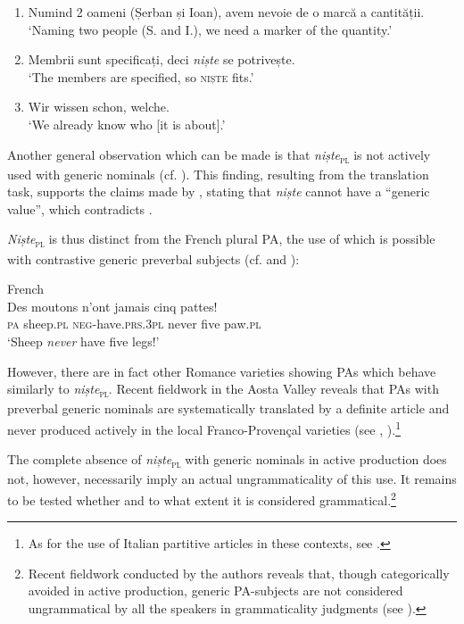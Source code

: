 \documentclass[output=paper,colorlinks,citecolor=brown]{langscibook}
\begin{document}
\begin{enumerate}
    \item   Numind 2 oameni (Șerban și Ioan), avem nevoie de o marc\u{a} a cantit\u{a}ții.\\
            ‘Naming two people (S. and I.), we need a marker of the quantity.’\label{it1}
    \item   Membrii sunt specificați, deci \textit{niște} se potrivește.\\
            ‘The members are specified, so \textsc{niște} fits.’\label{it2}
    \item   Wir wissen schon, welche.\\
            ‘We already know who [it is about].’\label{it3}
\end{enumerate}

Another general observation which can be made is that \textit{niște}\textsubscript{\textsc{pl}} is not actively used with generic nominals (cf. ). This finding, resulting from the translation task, supports the claims made by \citet[82]{Avram1986}, stating that \textit{niște} cannot have a “generic value”, which contradicts \citet[207]{Nedelcu2009}.

\textit{Niște}\textsubscript{\textsc{pl}} is thus distinct from the French plural PA, the use of which is possible with contrastive generic preverbal subjects (cf. \citealt[69]{VogeleerTasmowski2005} and \cite[165]{Wilmet2003}):

\ea\label{ex:ds38} French\\
\gll Des moutons n’ont          \textup{jamais} cinq pattes!\\
     \textsc{pa}   sheep.\textsc{pl} \textsc{neg}{}-have.\textsc{prs.3pl} never  five  paw.\textsc{pl}\\
\glt ‘Sheep \textit{never} have five legs!’
\z

However, there are in fact other Romance varieties showing PAs which behave similarly to \textit{niște}\textsubscript{\textsc{pl}}. Recent fieldwork in the Aosta Valley reveals that PAs with preverbal generic nominals are systematically translated by a definite article and never produced actively in the local Franco-Provençal varieties (see \citealt{StarkGerards2020}, \citealt{Ihsane2018}).\footnote{As for the use of Italian partitive articles in these contexts, see \citet[77]{CardinalettiGiusti2016}.\label{fn17}} 

The complete absence of \textit{niște}\textsubscript{\textsc{pl}} with generic nominals in active production does not, however, necessarily imply an actual ungrammaticality of this use. It remains to be tested whether and to what extent it is considered grammatical.\footnote{Recent fieldwork conducted by the authors reveals that, though categorically avoided in active production, generic PA-subjects are not considered ungrammatical by all the speakers in grammaticality judgments (see \cite{DavatzIhsaneStark2023}).}
\end{document}
